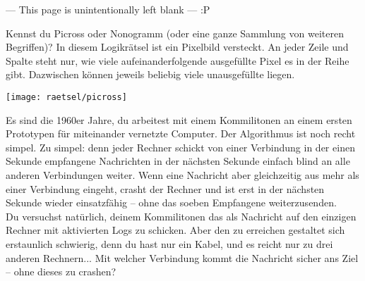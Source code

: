 
\ifcase\numexpr {} \relax
\or
\hbox{}
\vspace{5mm}
\begin{center}
\tiny
--- This page is unintentionally left blank ---
\vfill
:P
\end{center}
\newpage
\fi



Kennst du Picross oder Nonogramm (oder eine ganze Sammlung von weiteren Begriffen)?
In diesem Logikrätsel ist ein Pixelbild versteckt.
An jeder Zeile und Spalte steht nur, wie viele aufeinanderfolgende ausgefüllte Pixel es in der Reihe gibt.
Dazwischen können jeweils beliebig viele unausgefüllte liegen.

\vfill
\texttt{[image: raetsel/picross]}

\vspace{3mm}


\pagebreak

Es sind die 1960er Jahre, du arbeitest mit einem Kommilitonen an einem ersten Prototypen für miteinander vernetzte Computer.
Der Algorithmus ist noch recht simpel.
Zu simpel: denn jeder Rechner schickt von einer Verbindung in der einen Sekunde empfangene Nachrichten in der nächsten Sekunde einfach blind an alle anderen Verbindungen weiter.
Wenn eine Nachricht aber gleichzeitig aus mehr als einer Verbindung eingeht,
 crasht der Rechner und ist erst in der nächsten Sekunde wieder einsatzfähig --
 ohne das soeben Empfangene weiterzusenden.
\\
Du versuchst natürlich, deinem Kommilitonen das als Nachricht auf den einzigen Rechner mit aktivierten Logs zu schicken.
Aber den zu erreichen gestaltet sich erstaunlich schwierig,
 denn du hast nur ein Kabel, und es reicht nur zu drei anderen Rechnern...
Mit welcher Verbindung kommt die Nachricht sicher ans Ziel -- ohne dieses zu crashen?

\vfill%

